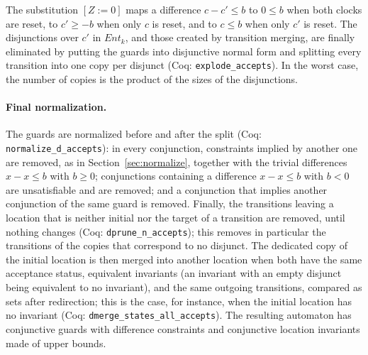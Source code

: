 The substitution $[Z:=0]$ maps a difference $c-c'\le b$ to $0\le b$ when both
clocks are reset, to $c'\ge -b$ when only $c$ is reset, and to $c\le b$ when
only $c'$ is reset.  The disjunctions over $c'$ in $\mathit{Ent}_k$, and those created by
transition merging, are finally eliminated by putting the guards into
disjunctive normal form and splitting every transition into one copy per
disjunct (Coq: \texttt{explode\_\allowbreak{}accepts}).  In the worst case, the number
of copies is the product of the sizes of the disjunctions.

\paragraph{Final normalization.}
The guards are normalized before and after the split (Coq:
\texttt{normalize\_\allowbreak{}d\_\allowbreak{}accepts}): in every conjunction, constraints
implied by another one are removed, as in Section~\ref{sec:normalize}, together
with the trivial differences $x-x\le b$ with $b\ge0$; conjunctions containing a
difference $x-x\le b$ with $b<0$ are unsatisfiable and are removed; and a
conjunction that implies another conjunction of the same guard is removed.
Finally, the transitions leaving a location that is neither initial nor the
target of a transition are removed, until nothing changes (Coq:
\texttt{dprune\_\allowbreak{}n\_\allowbreak{}accepts}); this removes in particular the
transitions of the copies that correspond to no disjunct.  The dedicated copy
of the initial location is then merged into another location when both have
the same acceptance status, equivalent invariants (an invariant with an empty
disjunct being equivalent to no invariant), and the same outgoing
transitions, compared as sets after redirection; this is the case, for
instance, when the initial location has no invariant (Coq:
\texttt{dmerge\_\allowbreak{}states\_\allowbreak{}all\_\allowbreak{}accepts}).  The resulting
automaton has conjunctive guards with difference constraints and conjunctive
location invariants made of upper bounds.

